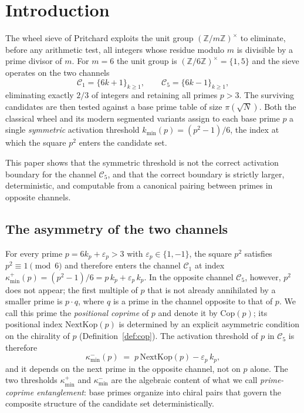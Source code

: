 \documentclass[11pt]{amsart}
\numberwithin{equation}{section}
\newcommand{\ZZ}{\mathbb{Z}}
\newcommand{\kminp}{\kappa_{\min}^{+}}
\newcommand{\kminm}{\kappa_{\min}^{-}}
\newcommand{\Cone}{\mathcal{C}_1}
\newcommand{\Cfive}{\mathcal{C}_5}
\newcommand{\NextKop}{\mathrm{NextKop}}
\newcommand{\Cop}{\mathrm{Cop}}
\theoremstyle{plain}
\theoremstyle{definition}
\begin{document}
\maketitle

\section{Introduction}
\label{sec:intro}

The wheel sieve of Pritchard \cite{Pritchard1981,Pritchard1982} exploits
the unit group $(\ZZ/m\ZZ)^\times$ to eliminate, before any arithmetic
test, all integers whose residue modulo $m$ is divisible by a prime
divisor of $m$. For $m=6$ the unit group is $(\ZZ/6\ZZ)^\times=\{1,5\}$
and the sieve operates on the two channels
\begin{equation}
\Cone=\{6k+1\}_{k\ge 1},\qquad \Cfive=\{6k-1\}_{k\ge 1},
\end{equation}
eliminating exactly $2/3$ of integers and retaining all primes $p>3$.
The surviving candidates are then tested against a base prime table of
size $\pi(\sqrt{N})$. Both the classical wheel and its modern segmented
variants \cite{Sorenson1998,Galway2004} assign to each base prime $p$
a single \emph{symmetric} activation threshold $k_{\min}(p)=(p^2-1)/6$,
the index at which the square $p^2$ enters the candidate set.

This paper shows that the symmetric threshold is not the correct
activation boundary for the channel $\Cfive$, and that the correct
boundary is strictly larger, deterministic, and computable from a
canonical pairing between primes in opposite channels.

\subsection{The asymmetry of the two channels}

For every prime $p=6k_p+\varepsilon_p>3$ with $\varepsilon_p\in\{1,-1\}$,
the square $p^2$ satisfies $p^2\equiv 1\pmod 6$ and therefore enters
the channel $\Cone$ at index $\kminp(p)=(p^2-1)/6=p\,k_p+\varepsilon_p\,k_p$.
In the opposite channel $\Cfive$, however, $p^2$ does not appear; the
first multiple of $p$ that is not already annihilated by a smaller
prime is $p\cdot q$, where $q$ is a prime in the channel opposite to
that of $p$. We call this prime the \emph{positional coprime} of $p$
and denote it by $\Cop(p)$; its positional index $\NextKop(p)$ is
determined by an explicit asymmetric condition on the chirality of $p$
(Definition~\ref{def:cop}). The activation threshold of $p$ in
$\Cfive$ is therefore
\begin{equation}
\kminm(p) \;=\; p\,\NextKop(p)-\varepsilon_p\,k_p,
\end{equation}
and it depends on the next prime in the opposite channel, not on $p$
alone. The two thresholds $\kminp$ and $\kminm$ are the algebraic
content of what we call \emph{prime-coprime entanglement}: base primes
organize into chiral pairs that govern the composite structure of the
candidate set deterministically.
\end{document}
